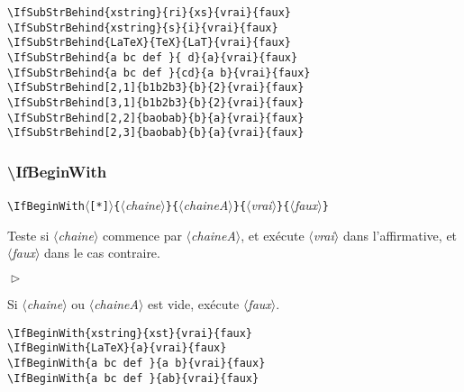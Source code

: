 \documentclass[a4paper,10pt]{article}
\newcommand\argu[1]{$\langle$\textit{#1}$\rangle$}
\newcommand\ARGU[1]{\texttt{\color{black}\{}\argu{#1}\texttt{\color{black}\}}}
\newcommand\etoile{$\langle$\texttt{[*]}$\rangle$}
\newenvironment{Conditions}[1][1cm]%
{\begin{list}%
	{$\vartriangleright$}%
	{\setlength{\leftmargin}{#1}
	 \setlength{\itemsep}{0pt}
	 \setlength{\parsep}{0pt}
	 \setlength{\topsep}{2ptplus3ptminus2pt}
	}}%
{\end{list}}
\newcommand\styleexemple{\small\vskip4pt}
\newcommand\verbinline{\lstinline[basicstyle=\normalsize\ttfamily]}
\begin{document}
\begin{minipage}[t]{0.65\linewidth}
\begin{lstlisting}
\IfSubStrBehind{xstring}{ri}{xs}{vrai}{faux}
\IfSubStrBehind{xstring}{s}{i}{vrai}{faux}
\IfSubStrBehind{LaTeX}{TeX}{LaT}{vrai}{faux}
\IfSubStrBehind{a bc def }{ d}{a}{vrai}{faux}
\IfSubStrBehind{a bc def }{cd}{a b}{vrai}{faux}
\IfSubStrBehind[2,1]{b1b2b3}{b}{2}{vrai}{faux}
\IfSubStrBehind[3,1]{b1b2b3}{b}{2}{vrai}{faux}
\IfSubStrBehind[2,2]{baobab}{b}{a}{vrai}{faux}
\IfSubStrBehind[2,3]{baobab}{b}{a}{vrai}{faux}
\end{lstlisting}%
\end{minipage}\hfill
\begin{minipage}[t]{0.35\linewidth}
	\styleexemple
	\par
	\par
	\par
	\par
	\par
	\par
	\par
	\par
\end{minipage}%

\subsubsection{\ttfamily\textbackslash IfBeginWith}
\verbinline|\IfBeginWith|\etoile\ARGU{chaine}\ARGU{chaineA}\ARGU{vrai}\ARGU{faux}
\smallskip

Teste si \argu{chaine} commence par \argu{chaineA}, et exécute \argu{vrai} dans l'affirmative, et \argu{faux} dans le cas contraire.\medskip

\begin{Conditions}
\item Si \argu{chaine} ou \argu{chaineA} est vide, exécute \argu{faux}.
\end{Conditions}

\begin{minipage}[t]{0.65\linewidth}
\begin{lstlisting}
\IfBeginWith{xstring}{xst}{vrai}{faux}
\IfBeginWith{LaTeX}{a}{vrai}{faux}
\IfBeginWith{a bc def }{a b}{vrai}{faux}
\IfBeginWith{a bc def }{ab}{vrai}{faux}
\end{lstlisting}%
\end{minipage}\hfill
\begin{minipage}[t]{0.35\linewidth}
	\styleexemple
	\par
	\par
	\par
\end{minipage}%
\end{document}
